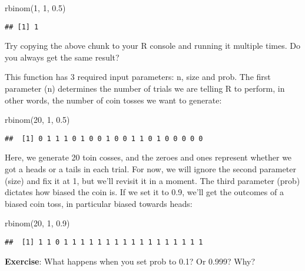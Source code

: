 \documentclass[
]{book}
\newenvironment{Shaded}{\begin{snugshade}}{\end{snugshade}}
\newcommand{\DecValTok}[1]{\textcolor[rgb]{0.00,0.00,0.81}{#1}}
\newcommand{\FloatTok}[1]{\textcolor[rgb]{0.00,0.00,0.81}{#1}}
\newcommand{\FunctionTok}[1]{\textcolor[rgb]{0.00,0.00,0.00}{#1}}
\newcommand{\NormalTok}[1]{#1}
\begin{document}
\begin{Shaded}
\begin{Highlighting}[]
\FunctionTok{rbinom}\NormalTok{(}\DecValTok{1}\NormalTok{, }\DecValTok{1}\NormalTok{, }\FloatTok{0.5}\NormalTok{)}
\end{Highlighting}
\end{Shaded}

\begin{verbatim}
## [1] 1
\end{verbatim}

Try copying the above chunk to your R console and running it multiple times. Do you always get the same result?

This function has 3 required input parameters: n, size and prob. The first parameter (n) determines the number of trials we are telling R to perform, in other words, the number of coin tosses we want to generate:

\begin{Shaded}
\begin{Highlighting}[]
\FunctionTok{rbinom}\NormalTok{(}\DecValTok{20}\NormalTok{, }\DecValTok{1}\NormalTok{, }\FloatTok{0.5}\NormalTok{)}
\end{Highlighting}
\end{Shaded}

\begin{verbatim}
##  [1] 0 1 1 1 0 1 0 0 1 0 0 1 1 0 1 0 0 0 0 0
\end{verbatim}

Here, we generate 20 toin cosses, and the zeroes and ones represent whether we got a heads or a tails in each trial. For now, we will ignore the second parameter (size) and fix it at 1, but we'll revisit it in a moment. The third parameter (prob) dictates how biased the coin is. If we set it to 0.9, we'll get the outcomes of a biased coin toss, in particular biased towards heads:

\begin{Shaded}
\begin{Highlighting}[]
\FunctionTok{rbinom}\NormalTok{(}\DecValTok{20}\NormalTok{, }\DecValTok{1}\NormalTok{, }\FloatTok{0.9}\NormalTok{)}
\end{Highlighting}
\end{Shaded}

\begin{verbatim}
##  [1] 1 1 0 1 1 1 1 1 1 1 1 1 1 1 1 1 1 1 1 1
\end{verbatim}

\textbf{Exercise}: What happens when you set prob to 0.1? Or 0.999? Why?
\end{document}
